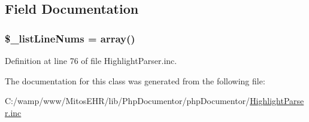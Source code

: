 

\subsection{\-Field \-Documentation}
\hypertarget{classphp_documentor___highlight_word_parser_adbfd10e0d8d8ce86f1ee4e94ad658666}{
\subsubsection[{\$\-\_\-list\-Line\-Nums}]{\setlength{\rightskip}{0pt plus 5cm}\$\-\_\-list\-Line\-Nums = array()}}\label{classphp_documentor___highlight_word_parser_adbfd10e0d8d8ce86f1ee4e94ad658666}


\-Definition at line 76 of file \-Highlight\-Parser.\-inc.



\-The documentation for this class was generated from the following file\-:\begin{DoxyCompactItemize}
\item 
\-C\-:/wamp/www/\-Mitos\-E\-H\-R/lib/\-Php\-Documentor/php\-Documentor/\hyperlink{_highlight_parser_8inc}{\-Highlight\-Parser.\-inc}\end{DoxyCompactItemize}
